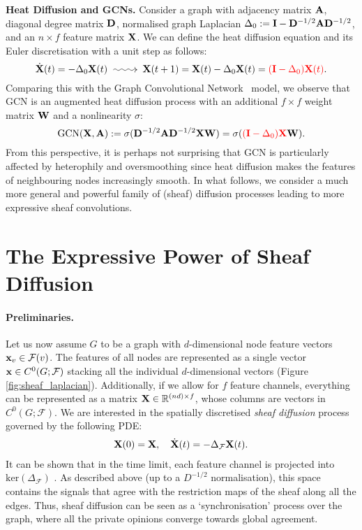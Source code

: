 \documentclass{article}
\def\vx{{\bf{x}}}
\def\mA{{\bf{A}}}
\def\mD{{\bf{D}}}
\def\mI{{\bf{I}}}
\def\mW{{\bf{W}}}
\def\mX{{\bf{X}}}
\def\gF{{\mathcal{F}}}
\def\sR{{\mathbb{R}}}
\begin{document}
\textbf{Heat Diffusion and GCNs. } Consider a graph with adjacency matrix $\mA$, diagonal degree matrix $\mD$, normalised graph Laplacian $\Delta_0 := \mI - \mD^{-1/2}\mA\mD^{-1/2}$, and an $n \times f$ feature matrix $\mX$. We can define the heat diffusion equation and its Euler discretisation with a unit step as follows: 
\begin{equation}
    \dot{\mX}(t) = -\Delta_0 \mX(t) \xymatrix{{}\ar@{~>}[r]&{}} \mX(t + 1) = \mX(t) - \Delta_0\mX(t) = {\color{red}(\mI - \Delta_0)\mX(t)}.
\end{equation}
Comparing this with the Graph Convolutional Network~\citep{kipf2017graph} model, we observe that GCN is an augmented heat diffusion process with an additional $f \times f$ weight matrix $\mW$ and a nonlinearity $\sigma$:
\begin{equation}\label{eq:gcn_diffusion}
    \mathrm{GCN}(\mX, \mA) :=  \sigma (\mD^{-1/2}\mA\mD^{-1/2}\mX\mW) = \sigma ({\color{red}(\mI - \Delta_0)\mX}\mW).
\end{equation}
From this perspective, it is perhaps not surprising that GCN is particularly affected by heterophily and oversmoothing since heat diffusion makes the features of neighbouring nodes increasingly smooth. In what follows, we consider a much more general and powerful family of (sheaf) diffusion processes leading to more expressive sheaf convolutions. 

\section{The Expressive Power of Sheaf Diffusion}\label{sec:diffusion_power_big}

\paragraph{Preliminaries.} Let us now assume $G$ to be a graph with $d$-dimensional node feature vectors $\vx_v \in \gF(v)$. The features of all nodes are represented as a single vector $\vx \in C^0(G; \gF)$ stacking all the individual $d$-dimensional vectors (Figure \ref{fig:sheaf_laplacian}). Additionally, if we allow for $f$ feature channels, everything can be represented as a matrix $\mX \in \sR^{(nd) \times f}$, whose columns are vectors in $C^0(G; \gF)$. We are interested in the spatially discretised {\em sheaf diffusion} process governed by the following PDE:
\begin{align}\label{eq:diffusion}
    \mX(0) = \mX,
    \quad 
    \dot{\mX}(t) = -\Delta_\gF \mX(t).\vspace{-2mm}
\end{align}
It can be shown that in the time limit, each feature channel is projected into $\mathrm{ker}(\Delta_\gF)$ \citep{hansen2019toward}. As described above (up to a $D^{-1/2}$ normalisation), this space contains the signals that agree with the restriction maps of the sheaf along all the edges. Thus, sheaf diffusion can be seen as a `synchronisation' process over the graph, where all the private opinions converge towards global agreement. 
\end{document}
